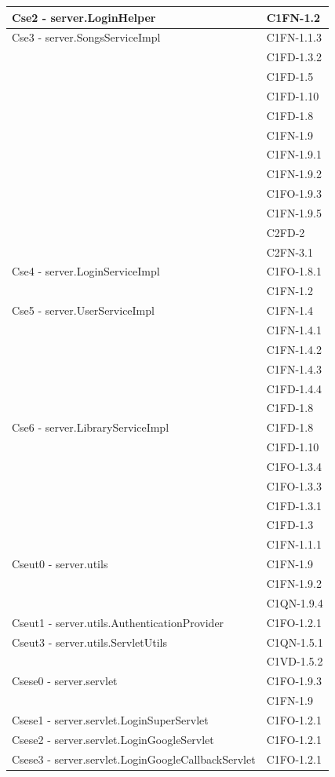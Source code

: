 \begin{footnotesize}
\begin{longtable}[!h]{|l|l|}
Cse2 - server.LoginHelper & C1FN-1.2 \\\hline
Cse3 - server.SongsServiceImpl & C1FN-1.1.3 \\
& C1FD-1.3.2 \\
& C1FD-1.5 \\
& C1FD-1.10 \\
& C1FD-1.8 \\
& C1FN-1.9 \\
& C1FN-1.9.1 \\
& C1FN-1.9.2 \\
& C1FO-1.9.3 \\
& C1FN-1.9.5 \\
& C2FD-2 \\
& C2FN-3.1 \\\hline
Cse4 - server.LoginServiceImpl & C1FO-1.8.1 \\
& C1FN-1.2 \\\hline
Cse5 - server.UserServiceImpl & C1FN-1.4 \\
& C1FN-1.4.1 \\
& C1FN-1.4.2 \\
& C1FN-1.4.3 \\
& C1FD-1.4.4 \\
& C1FD-1.8 \\\hline
Cse6 - server.LibraryServiceImpl & C1FD-1.8 \\
& C1FD-1.10 \\
& C1FO-1.3.4 \\
& C1FO-1.3.3 \\
& C1FD-1.3.1 \\
& C1FD-1.3 \\
& C1FN-1.1.1 \\\hline
Cseut0 - server.utils & C1FN-1.9 \\
& C1FN-1.9.2 \\
& C1QN-1.9.4 \\\hline
Cseut1 - server.utils.AuthenticationProvider & C1FO-1.2.1 \\\hline
Cseut3 - server.utils.ServletUtils & C1QN-1.5.1 \\
& C1VD-1.5.2 \\\hline
Csese0 - server.servlet & C1FO-1.9.3 \\
& C1FN-1.9 \\\hline
Csese1 - server.servlet.LoginSuperServlet &  C1FO-1.2.1 \\\hline
Csese2 - server.servlet.LoginGoogleServlet & C1FO-1.2.1 \\\hline
Csese3 - server.servlet.LoginGoogleCallbackServlet & C1FO-1.2.1 \\\hline

\end{longtable}
\end{footnotesize}
